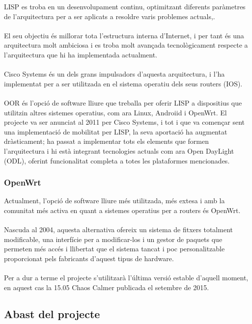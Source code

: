 \documentclass[11pt]{article}
\begin{document}
LISP es troba en un desenvolupament continu, optimitzant diferents paràmetres de l’arquitectura per a ser aplicats a resoldre varis problemes actuals\cite{freitas15},\cite{cisco15}.\\
\\
El seu objectiu és millorar tota l’estructura interna d’Internet, i per tant és una arquitectura molt ambiciosa i es troba molt avançada tecnològicament respecte a l’arquitectura que hi ha implementada actualment. \\
\\
Cisco Systems és un dels grans impulsadors d’aquesta arquitectura, i l’ha implementat per a ser utilitzada en el sistema operatiu dels seus routers (IOS).\\
\\
OOR és l’opció de software lliure que treballa per oferir LISP a dispositius que utilitzin altres sistemes operatius, com ara Linux, Androiid i OpenWrt. El projecte va ser anunciat al 2011 per Cisco Systems, i tot i que va començar sent una implementació de mobilitat per LISP\cite{albert09}, la seva aportació ha augmentat dràsticament; ha passat a implementar tots els elements que formen l’arquitectura i hi està integrant tecnologies actuals com ara Open DayLight (ODL)\cite{alberts15}, oferint funcionalitat completa a totes les plataformes mencionades.

\subsubsection{OpenWrt}
Actualment, l’opció de software lliure més utilitzada, més extesa i amb la comunitat més activa en quant a sistemes operatius per a routers és OpenWrt. \\
\\
Nascuda al 2004, aquesta alternativa ofereix un sistema de fitxers totalment modificable, una interfície per a modificar-los i un gestor de paquets que permeten més accés i llibertat que el sistema tancat i poc personalitzable proporcionat pels fabricants d’aquest tipus de hardware.\\
\\
Per a dur a terme el projecte s’utilitzarà l’última versió estable d’aquell moment, en aquest cas la 15.05 Chaos Calmer publicada el setembre de 2015.
\subsection{Abast del projecte}
\end{document}
